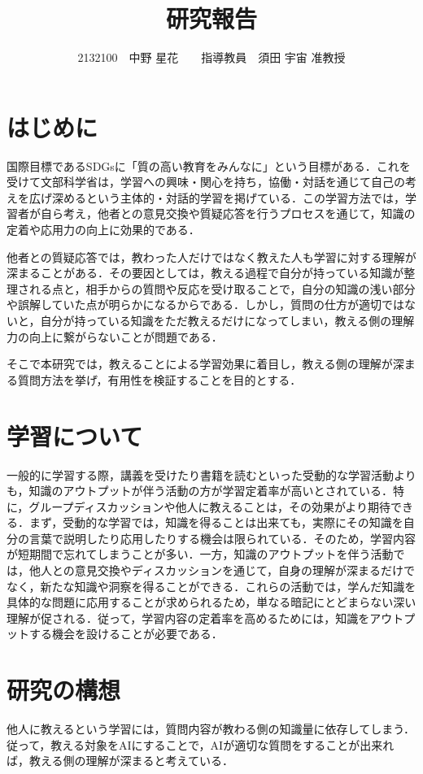 \documentclass[twocolumn,10pt,a4j]{ltjsarticle}
\title{研究報告}
\author{2132100　中野 星花　　指導教員　須田 宇宙 准教授}
\date{}
\begin{document}
\maketitle

\section{はじめに}
国際目標であるSDGsに「質の高い教育をみんなに」という目標がある．これを受けて文部科学省は，学習への興味・関心を持ち，協働・対話を通じて自己の考えを広げ深めるという主体的・対話的学習を掲げている．この学習方法では，学習者が自ら考え，他者との意見交換や質疑応答を行うプロセスを通じて，知識の定着や応用力の向上に効果的である．

他者との質疑応答では，教わった人だけではなく教えた人も学習に対する理解が深まることがある．その要因としては，教える過程で自分が持っている知識が整理される点と，相手からの質問や反応を受け取ることで，自分の知識の浅い部分や誤解していた点が明らかになるからである．しかし，質問の仕方が適切ではないと，自分が持っている知識をただ教えるだけになってしまい，教える側の理解力の向上に繋がらないことが問題である．

そこで本研究では，教えることによる学習効果に着目し，教える側の理解が深まる質問方法を挙げ，有用性を検証することを目的とする．

\section{学習について}
一般的に学習する際，講義を受けたり書籍を読むといった受動的な学習活動よりも，知識のアウトプットが伴う活動の方が学習定着率が高いとされている．特に，グループディスカッションや他人に教えることは，その効果がより期待できる．まず，受動的な学習では，知識を得ることは出来ても，実際にその知識を自分の言葉で説明したり応用したりする機会は限られている．そのため，学習内容が短期間で忘れてしまうことが多い．一方，知識のアウトプットを伴う活動では，他人との意見交換やディスカッションを通じて，自身の理解が深まるだけでなく，新たな知識や洞察を得ることができる．これらの活動では，学んだ知識を具体的な問題に応用することが求められるため，単なる暗記にとどまらない深い理解が促される．従って，学習内容の定着率を高めるためには，知識をアウトプットする機会を設けることが必要である．

\section{研究の構想}
他人に教えるという学習には，質問内容が教わる側の知識量に依存してしまう．従って，教える対象をAIにすることで，AIが適切な質問をすることが出来れば，教える側の理解が深まると考えている．
\end{document}
